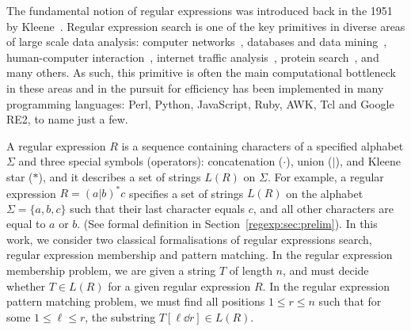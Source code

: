 
The fundamental notion of regular expressions was introduced back in the 1951 by Kleene~\cite{RM-704}. Regular expression search is one of the key primitives in diverse areas of large scale data analysis: computer networks~\cite{10.1145/1159913.1159952}, databases and data mining~\cite{1000341,10.5555/645927.672035,10.1145/375551.375569}, human-computer interaction~\cite{10.1145/2207676.2208694}, internet traffic analysis~\cite{4221791,4579527}, protein search~\cite{10.1145/369133.369220}, and many others. As such, this primitive is often the main computational bottleneck in these areas and in the pursuit for efficiency has been implemented in many programming languages:
Perl, Python, JavaScript, Ruby, AWK, Tcl and Google RE2, to name just a few.

A regular expression $R$ is a sequence containing characters of a specified alphabet $\Sigma$ and three special symbols (operators): concatenation ($\cdot$), union ($|$), and Kleene star ($\ast$), and it describes a set of strings $L(R)$ on $\Sigma$. For example, a regular expression $R = (a|b)^\ast c$ specifies a set of strings $L(R)$ on the alphabet $\Sigma = \{a,b,c\}$ such that their last character equals $c$, and all other characters are equal to $a$ or $b$. (See formal definition in Section~\ref{regexp:sec:prelim}). In this work, we consider two classical formalisations of regular expressions search, regular expression membership and pattern matching. In the regular expression membership problem, we are given a string $T$ of length $n$, and must decide whether $T \in L(R)$ for a given regular expression $R$. In the regular expression pattern matching problem, we must find all positions $1 \le r \le n$ such that for some $1 \le \ell \le r$, the substring $T[\ell \dd r] \in L(R)$. 

